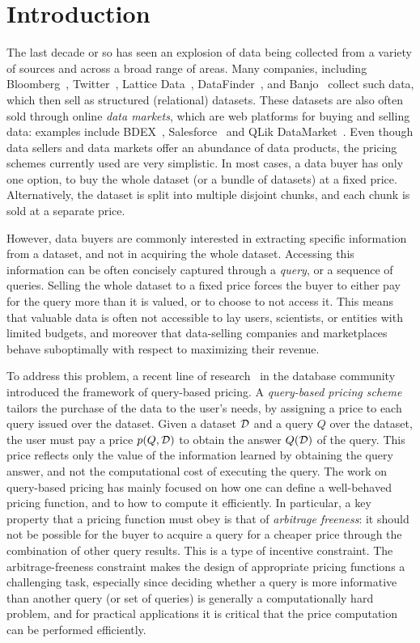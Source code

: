\section{Introduction}
\label{sec:intro}

The last decade or so has seen an explosion of data being collected from a variety of sources and across a broad range of areas. Many companies, including Bloomberg~\cite{bloomberg}, Twitter~\cite{twitterapi}, Lattice Data~\cite{lattice}, DataFinder~\cite{datafinder}, and Banjo~\cite{banjo} collect such data, which then sell as structured (relational) datasets. 
These datasets are also often sold through online {\em data markets}, which are web platforms for buying and selling data: examples include BDEX~\cite{bdex}, Salesforce~\cite{salesforce} and QLik DataMarket~\cite{qlik}. Even though data sellers and data markets offer an abundance of data products, the pricing schemes currently used are very simplistic. In most cases, a data buyer has only one option, to buy the whole dataset (or a bundle of datasets) at a fixed price. Alternatively, the dataset is split into multiple disjoint chunks, and each chunk is sold at a separate price. 

However, data buyers are commonly interested in extracting specific information from a dataset, and not in acquiring the whole dataset. Accessing this information can be often concisely captured through a {\em query}, or a sequence of queries. Selling the whole dataset to a fixed price forces the buyer to either pay for the query more than it is valued, or to choose to not access it. This means that valuable data is often not accessible to lay users, scientists, or entities with limited budgets, and moreover that data-selling companies and marketplaces behave suboptimally with respect to maximizing their revenue.

To address this problem, a recent line of research~\cite{KUBHS12,KUBHS13,deep2017qirana} in the database community introduced the framework of  query-based pricing. A {\em query-based pricing scheme} tailors the purchase of the data to the user's needs, by assigning a price to each query issued over the dataset. Given a dataset $\mathcal{D}$ and a query $Q$ over the dataset, the user must pay a price $p(Q,\mathcal{D})$ to obtain the answer $Q(\mathcal{D})$ of the query. This price reflects only the value of the information learned by obtaining the query answer, and not the computational cost of executing the query. The work on query-based pricing has mainly focused on how one can define a well-behaved pricing function, and to how to compute it efficiently. In particular, a key property that a pricing function must obey is that of {\em arbitrage freeness}: it should not be possible for the buyer to acquire a query for a cheaper price through the combination of other query results. This is a type of incentive constraint. The arbitrage-freeness constraint makes the design of appropriate pricing functions a challenging task, especially since deciding whether a query is more informative than another query (or set of queries) is generally a computationally hard problem, and for practical applications it is critical that the price computation can be performed efficiently.

